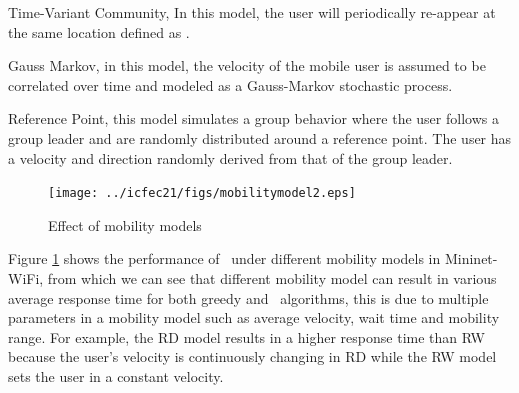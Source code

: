  Time-Variant Community, In this model, the user will periodically re-appear at the same location defined as .

 Gauss Markov, in this model, the velocity of the mobile user is assumed to be correlated over time and modeled as a Gauss-Markov stochastic process.

 Reference Point, this model simulates a group behavior where the user follows a group leader and are randomly distributed around a reference point. The user has a velocity and direction randomly derived from that of the group leader.

\begin{figure}
	\centering
	\texttt{[image: ../icfec21/figs/mobilitymodel2.eps]}
	\vspace{\baselineskip}
	\caption{Effect of mobility models}
	\label{fig:Mobility models}
\end{figure}

Figure \ref{fig:Mobility models} shows the performance of \myalgorithm\ under different mobility models in Mininet-WiFi, from which we can see that different mobility model can result in various average response time for both greedy and \myalgorithm\ algorithms, this is due to multiple parameters in a mobility model such as average velocity, wait time and mobility range. For example, the RD model results in a higher response time than RW because the user's velocity is continuously changing in RD while the RW model sets the user in a constant velocity.

